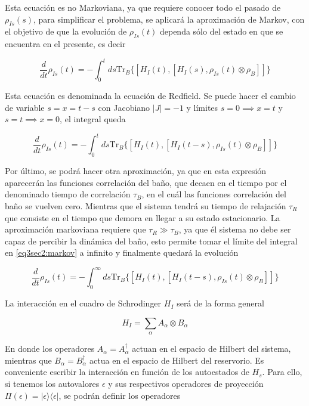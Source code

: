 Esta ecuación es no Markoviana, ya que requiere conocer todo el pasado de $\rho_{Is}(s)$, para simplificar el problema, se aplicará la aproximación de Markov, con el objetivo de que la evolución de $\rho_{Is}(t)$ dependa sólo del estado en que se encuentra en el presente, es decir

\begin{equation*}
    \frac{d}{dt}\rho_{Is}(t) = -  \int_{0}^{t}ds \text{Tr}_{B}\{[H_{I}(t), [H_{I}(s),\rho_{Is}(t) \otimes \rho_{B}]]\}
\end{equation*} 

Esta ecuación es denominada la ecuación de Redfield. Se puede hacer el cambio de variable $s= x = t-s$ con Jacobiano $|J| = -1$ y límites $s=0 \implies x = t$ y $s=t \implies x = 0$, el integral queda

\begin{equation}
    \frac{d}{dt}\rho_{Is}(t) = -  \int_{0}^{t}ds \text{Tr}_{B}\{[H_{I}(t), [H_{I}(t-s),\rho_{Is}(t) \otimes \rho_{B}]]\}
    \label{eq3sec2:markov}
\end{equation} 

Por último, se podrá hacer otra aproximación, ya que en esta expresión aparecerán las funciones correlación del baño, que decaen en el tiempo por el denominado tiempo de correlación $\tau_{B}$, en el cuál las funciones correlación del baño se vuelven cero. Mientras que el sistema tendrá su tiempo de relajación $\tau_{R}$ que consiste en el tiempo que demora en llegar a su estado estacionario. La aproximación markoviana requiere que $\tau_{R}\gg \tau_{B}$, ya que él sistema no debe ser capaz de percibir la dinámica del baño, esto permite tomar el límite del integral en \ref{eq3sec2:markov} a infinito y finalmente quedará la evolución

\begin{equation}
    \frac{d}{dt}\rho_{Is}(t) = -  \int_{0}^{\infty}ds \text{Tr}_{B}\{[H_{I}(t), [H_{I}(t-s),\rho_{Is}(t) \otimes \rho_{B}]]\}
    \label{eq3sec2:markov1}
\end{equation} 

La interacción en el cuadro de Schrodinger $H_{I}$ será de la forma general

\begin{equation*}
    H_{I} = \sum_{\alpha}A_{\alpha} \otimes B_{\alpha}
\end{equation*}

En donde los operadores $A_{\alpha} = A^{\dagger}_{\alpha}$ actuan en el espacio de Hilbert del sistema, mientras que $B_{\alpha}=B^{\dagger}_{\alpha}$ actua en el espacio de Hilbert del reservorio. Es conveniente escribir la interacción en función de los autoestados de $H_{s}$. Para ello, si tenemos los autovalores $\epsilon$ y sus respectivos operadores de proyección $\Pi(\epsilon) = |\epsilon\rangle \langle \epsilon|$, se podrán definir los operadores

